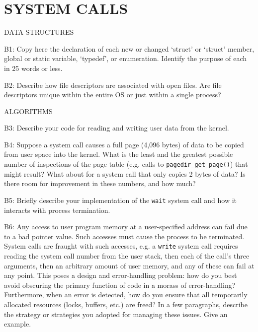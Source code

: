 \section{SYSTEM CALLS}
\begin{aspect}{DATA STRUCTURES}
	\begin{qc}
		B1: Copy here the declaration of each new or changed
		`struct' or `struct' member, global or static variable, `typedef', or enumeration.
		Identify the purpose of each in 25 words or less.
	\end{qc}

	\begin{qc}
		B2: Describe how file descriptors are associated with open files.
		Are file descriptors unique within the entire OS or just within a single process?
	\end{qc}
\end{aspect}

\begin{aspect}{ALGORITHMS}
	\begin{qc}
		B3: Describe your code for reading and writing user data from the kernel.
	\end{qc}

	\begin{qc}
		B4: Suppose a system call causes a full page (4,096 bytes) of data to be copied from user space into the kernel.
		What is the least and the greatest possible number of inspections of the page table (e.g. calls to \lstinline{pagedir_get_page()}) that might result?
		What about for a system call that only copies 2 bytes of data?
		Is there room for improvement in these numbers, and how much?
	\end{qc}

	\begin{qc}
		B5: Briefly describe your implementation of the \lstinline{wait} system call
		and how it interacts with process termination.
	\end{qc}

	\begin{qc}
		B6: Any access to user program memory at a user-specified address can fail due to a bad pointer value.
		Such accesses must cause the process to be terminated.
		System calls are fraught with such accesses,
		e.g. a \lstinline{write} system call requires reading the system call number from the user stack,
		then each of the call's three arguments, then an arbitrary amount of user memory, and any of these can fail at any point.
		This poses a design and error-handling problem: how do you best avoid obscuring the primary function of code in a morass of error-handling?
		Furthermore, when an error is detected, how do you ensure that all temporarily allocated resources (locks, buffers, etc.) are freed?
		In a few paragraphs, describe the strategy or strategies you adopted for managing these issues.
		Give an example.
	\end{qc}
\end{aspect}

